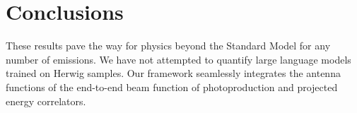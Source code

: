 \section{Conclusions}\label{sec:conclusions}

These results pave the way for physics beyond the Standard Model for any
number of emissions. We have not attempted to quantify large language
models trained on Herwig samples. Our framework seamlessly integrates
the antenna functions of the end-to-end beam function of photoproduction
and projected energy correlators.

